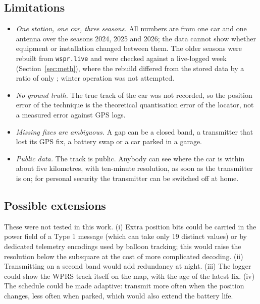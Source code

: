 \documentclass[10pt,a4paper]{article}
\begin{document}
\subsection{Limitations}
\begin{itemize}
\item \emph{One station, one car, three seasons.} All numbers are from one car and one antenna over the seasons 2024, 2025 and 2026; the data cannot show whether equipment or installation changed between them. The older seasons were rebuilt from \texttt{wspr.live} and were checked against a live-logged week (Section~\ref{sec:meth}), where the rebuild differed from the stored data by a ratio of only \cmpRatio; winter operation was not attempted.
\item \emph{No ground truth.} The true track of the car was not recorded, so the position error of the technique is the theoretical quantisation error of the locator, not a measured error against GPS logs.
\item \emph{Missing fixes are ambiguous.} A gap can be a closed band, a transmitter that lost its GPS fix, a battery swap or a car parked in a garage.
\item \emph{Public data.} The track is public. Anybody can see where the car is within about five kilometres, with ten-minute resolution, as soon as the transmitter is on; for personal security the transmitter can be switched off at home.
\end{itemize}

\subsection{Possible extensions}
These were not tested in this work. (i) Extra position bits could be carried in the power field of a Type 1 message (which can take only 19 distinct values) or by dedicated telemetry encodings used by balloon tracking; this would raise the resolution below the subsquare at the cost of more complicated decoding. (ii) Transmitting on a second band would add redundancy at night. (iii) The logger could show the WPRS track itself on the map, with the age of the latest fix. (iv) The schedule could be made adaptive: transmit more often when the position changes, less often when parked, which would also extend the battery life.
\end{document}
